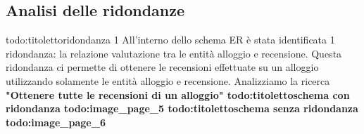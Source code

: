 \subsection{Analisi delle ridondanze}
{todo:titoletto}ridondanza 1
All'interno dello schema ER è stata identificata 1 ridondanza: la relazione valutazione tra le entità alloggio e recensione. Questa ridondanza ci permette di ottenere le recensioni effettuate su un alloggio utilizzando solamente le entità alloggio e recensione. Analizziamo la ricerca \bf"Ottenere tutte le recensioni di un alloggio" 
{todo:titoletto}schema con ridondanza
{todo:image_page_5}
{todo:titoletto}schema senza ridondanza
{todo:image_page_6}
